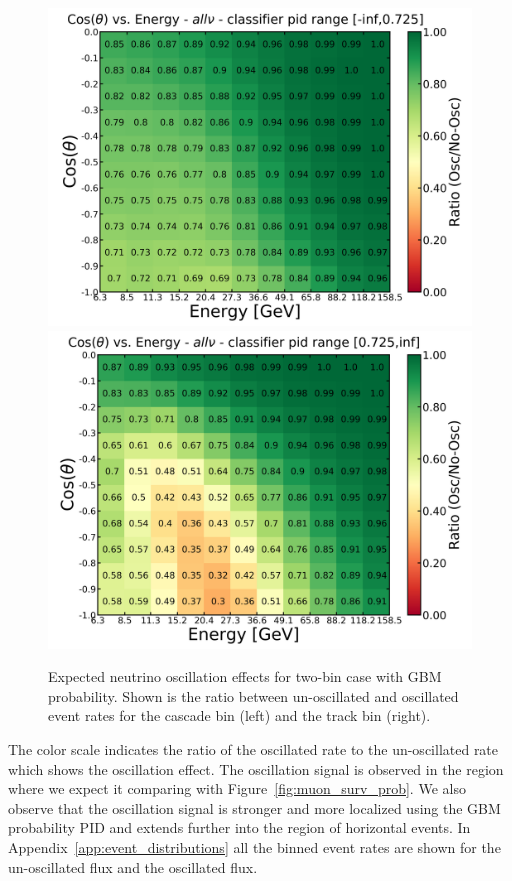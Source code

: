 \begin{figure}[h]
    \centering
    \includegraphics[width=0.49\linewidth]{figures/two_bin_cut_0725_allnu_0_ratio_osc_noosc.png}
    \includegraphics[width=0.49\linewidth]{figures/two_bin_cut_0725_allnu_1_ratio_osc_noosc.png}
    \caption[Expected neutrino oscillation effects for two-bin case with GBM probability]{Expected neutrino oscillation effects for two-bin case with GBM probability. Shown is the ratio between un-oscillated and oscillated event rates for the cascade bin (left) and the track bin (right).}
    \label{fig:oscillation_effects_gbm_2bin}
\end{figure}
The color scale indicates the ratio of the oscillated rate to the un-oscillated rate which shows the oscillation effect.
The oscillation signal is observed in the region where we expect it comparing with Figure~\ref{fig:muon_surv_prob}.
We also observe that the oscillation signal is stronger and more localized using the GBM probability PID and extends further into the region of horizontal events.
In Appendix~\ref{app:event_distributions} all the binned event rates are shown for the un-oscillated flux and the oscillated flux.

